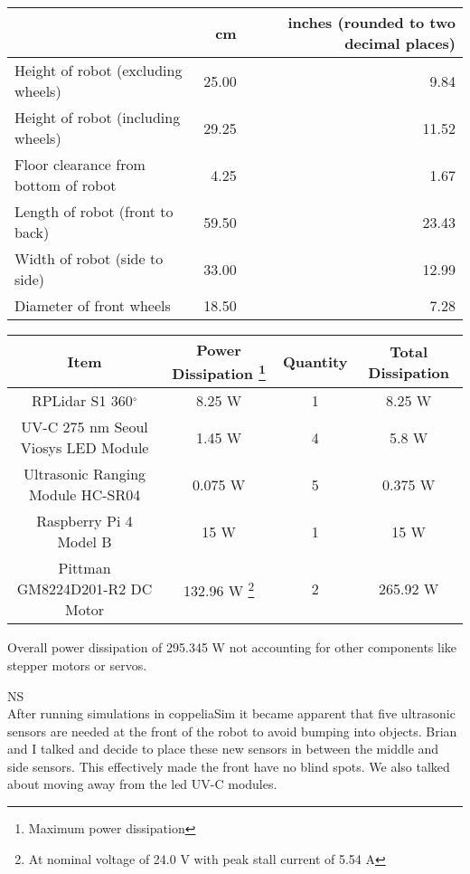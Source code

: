 \documentclass[fontsize=11pt, %
                             paper=a4, %
                             twoside, %
                             captions=tableheading,
                             index=totoc,
                             hyperref]{labbook}
\begin{document}
\begin{addmargin}[0cm]{0cm}
\begin{center}
\begin{tabular}{l r r}
 & cm & inches (rounded to two decimal places)\\
 \hline
 Height of robot (excluding wheels) & 25.00 & 9.84\\
 Height of robot (including wheels)	& 29.25 & 11.52 \\
 Floor clearance from bottom of robot & 4.25 & 1.67 \\
 Length of robot (front to back) & 59.50  & 23.43 \\
 Width of robot (side to side) & 33.00 & 12.99\\
 Diameter of front wheels & 18.50 & 7.28\\
\end{tabular}
\end{center}

\begin{minipage}{16cm}
\begin{center}
\begin{tabular}{|c|c|c|c|}
\hline
Item & Power Dissipation \footnote{Maximum power dissipation} & Quantity & Total Dissipation \\
\hline
RPLidar S1 360$^\circ$ & 8.25 W & 1 & 8.25 W\\
\hline
UV-C 275 nm Seoul Viosys LED Module & 1.45 W & 4 & 5.8 W\\
\hline
Ultrasonic Ranging Module HC-SR04 & 0.075 W & 5 & 0.375 W\\
\hline
Raspberry Pi 4 Model B & 15 W & 1 & 15 W\\
\hline
Pittman GM8224D201-R2 DC Motor & 132.96 W \footnote{At nominal voltage of 24.0 V with peak stall current of 5.54 A} & 2 & 265.92 W\\
\hline
\end{tabular}
\end{center}
\end{minipage}
Overall power dissipation of 295.345 W not accounting for other components like stepper motors or servos.

NS\\
After running simulations in coppeliaSim it became apparent that five ultrasonic sensors are needed at the front of the robot to avoid bumping into objects. Brian and I talked and decide to place these new sensors in between the middle and side sensors. This effectively made the front have no blind spots. We also talked about moving away from the led UV-C modules.


\end{addmargin}
\end{document}
